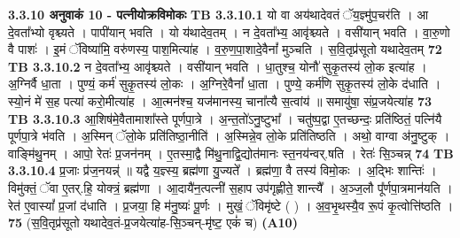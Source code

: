 \documentclass[17pt]{extarticle}
\begin{document}
{{{{{{{{{{{{{{{{{{{                \textbf{ 3.3.10    अनुवाकं   10 - पत्नीयोक्रविमोकः} \newline
                                \textbf{ TB 3.3.10.1} \newline
                  यो वा अय॑थादेवतं ॅय॒ज्ञ्मु॑प॒चर॑ति । आ दे॒वता᳚भ्यो वृश्च्यते । पापी॑यान् भवति । यो य॑थादेव॒तम् । न दे॒वता᳚भ्य॒ आवृ॑श्च्यते । वसी॑यान् भवति । वा॒रु॒णो वै पाशः॑ । इ॒मं ॅविष्या॑मि॒ वरु॑णस्य॒ पाश॒मित्या॑ह । व॒रु॒ण॒पा॒शादे॒वैनां᳚ मुञ्चति । स॒वि॒तृप्र॑सूतो यथादेव॒तम् \textbf{ 72} \newline
                  \newline
                                \textbf{ TB 3.3.10.2} \newline
                  न दे॒वता᳚भ्य॒ आवृ॑श्च्यते । वसी॑यान् भवति । धा॒तुश्च॒ योनौ॑ सुकृ॒तस्य॑ लो॒क इत्या॑ह । अ॒ग्निर्वै धा॒ता । पुण्यं॒ कर्म॑ सुकृ॒तस्य॑ लो॒कः । अ॒ग्निरे॒वैनां᳚ धा॒ता । पुण्ये॒ कर्म॑णि सुकृ॒तस्य॑ लो॒के द॑धाति । स्यो॒नं मे॑ स॒ह पत्या॑ करो॒मीत्या॑ह । आ॒त्मन॑श्च॒ यज॑मानस्य॒ चाना᳚त्यै स॒त्वांय॑ ॥ समायु॑षा॒ संप्र॒जयेत्या॑ह \textbf{ 73} \newline
                  \newline
                                \textbf{ TB 3.3.10.3} \newline
                  आ॒शिष॑मे॒वैतामाशा᳚स्ते पूर्णपा॒त्रे । अ॒न्त॒तो॑ऽनु॒ष्टुभा᳚ । चतु॑ष्प॒द्वा ए॒तच्छन्दः॒ प्रति॑ष्ठितं॒ पत्नि॑यै पूर्णपा॒त्रे भ॑वति । अ॒स्मिन् ॅलो॒के प्रति॑तिष्ठा॒नीति॑ । अ॒स्मिन्ने॒व लो॒के प्रति॑तिष्ठति । अथो॒ वाग्वा अ॑नु॒ष्टुक् । वाङ्मि॑थु॒नम् । आपो॒ रेतः॑ प्र॒जन॑नम् । ए॒तस्मा॒द्वै मि॑थु॒नाद्वि॒द्योत॑मानः स्त॒नय॑न्वर्.षति । रेतः॑ सि॒ञ्चन्न् \textbf{ 74} \newline
                  \newline
                                \textbf{ TB 3.3.10.4} \newline
                  प्र॒जाः प्र॑ज॒नयन्न्॑ ॥ यद्वै य॒ज्ञ्स्य॒ ब्रह्म॑णा यु॒ज्यते᳚ । ब्रह्म॑णा॒ वै तस्य॑ विमो॒कः । अ॒द्भिः शान्तिः॑ । विमु॑क्तं॒ ॅवा ए॒तर्.हि॒ योक्त्रं॒ ब्रह्म॑णा । आ॒दायै॑न॒त्पत्नी॑ स॒हाप उप॑गृह्णीते॒ शान्त्यै᳚ । अ॒ञ्ज॒लौ पू᳚र्णपा॒त्रमान॑यति । रेत॑ ए॒वास्यां᳚ प्र॒जां द॑धाति । प्र॒जया॒ हि म॑नु॒ष्यः॑ पू॒र्णः । मुखं॒ ॅविमृ॑ष्टे ( ) । अ॒व॒भृ॒थस्यै॒व रू॒पं कृ॒त्वोत्ति॑ष्ठति । \textbf{ 75} \newline
                  \newline
                                    (स॒वि॒तृप्र॑सूतो यथादेव॒तं-प्र॒जयेत्या॑ह-सि॒ञ्चन्-मृ॑ष्ट॒ एकं॑ च) \textbf{(A10)} \newline \newline
}}}}}}}}}}}}}}}}}}}
\end{document}
